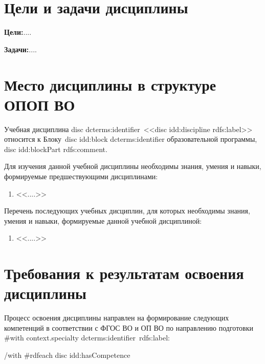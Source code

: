 \documentclass[12pt]{scrartcl}
\newcommand{\rdf}[2]{#2}
\newenvironment{rdfctx}[1]{}{}
\renewcommand{\paragraph}[1]{\par\textbf{#1}}
\begin{document}
\section{Цели и задачи дисциплины}
\begin{rdfctx}{\rdfsetctx{dc}{syll wpdd:courseDC !wpdd:CourseDC}}
\paragraph{Цели:}\rdf{dc wpdd:aim !cnt:ContentAsText}{....}
\paragraph{Задачи:}\rdf{dc wpdd:problem !cnt:ContentAsText}{....}
\end{rdfctx}

\section{Место дисциплины в структуре ОПОП ВО}
Учебная дисциплина {{disc dcterms:identifier}}~<<{{disc idd:discipline rdfs:label}}>> относится к
Блоку~{{disc idd:block dcterms:identifier}} образовательной программы, {{disc idd:blockPart rdfs:comment}}.

\begin{rdfctx}{\rdfsetctx{dc}{syll wpdd:courseDC !wpdd:CourseDC}}
Для изучения данной учебной дисциплины необходимы знания, умения и навыки,
формируемые предшествующими дисциплинами: \rdf{dc wpdd:require !cnt:ContentAsText}{%
  \begin{enumerate}
  \item <<....>>
  \end{enumerate}}

Перечень последующих учебных дисциплин, для которых необходимы знания, умения и
навыки, формируемые данной учебной дисциплиной: \rdf{dc wpdd:ensure !cnt:ContentAsText}{%
  \begin{enumerate}
  \item <<....>>
  \end{enumerate}}
\end{rdfctx}


\section{Требования к результатам освоения дисциплины}

Процесс освоения дисциплины направлен на формирование следующих компетенций в
соответствии с ФГОС ВО и ОП ВО по направлению подготовки {{#with context.specialty}}
{{dcterms:identifier}}~{{rdfs:label}}: \par {{/with}}
{{#rdfeach disc idd:hasCompetence}}
\end{document}
